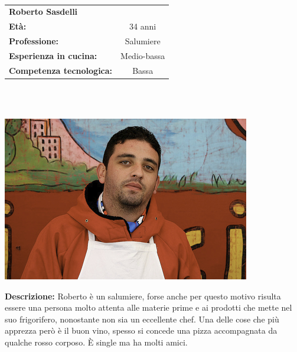 \hrulefill\\
\begin{minipage}{.75\textwidth}
\begin{tabular}{l | c}
	\textbf{Roberto Sasdelli} & \\
	\textbf{Età:} & 34 anni\\
	\textbf{Professione:} & Salumiere\\
	\textbf{Esperienza in cucina:} & Medio-bassa\\
	\textbf{Competenza tecnologica:} & Bassa\\
\end{tabular}\\\\
\end{minipage}
\begin{minipage}{.24\textwidth}
	\includegraphics[width=\textwidth]{img/personas/robertone}
\end{minipage}
	\textbf{Descrizione:}
	Roberto è un salumiere, forse anche per questo motivo risulta essere una
	persona molto attenta alle materie prime e ai prodotti che mette nel suo
	frigorifero, nonostante non sia un eccellente chef.  Una delle cose che
	più apprezza però è il buon vino, spesso si concede una pizza
	accompagnata da qualche rosso corposo. È single ma ha molti amici.

